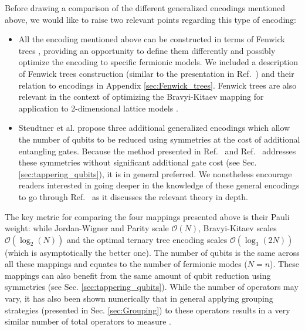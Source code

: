 Before drawing a comparison of the different generalized encodings mentioned above, we would like to raise two relevant points regarding this type of encoding: 
\begin{itemize}
    \item All the encoding mentioned above can be constructed in terms of Fenwick trees \cite{Havlek2017}, providing an opportunity to define them differently and possibly optimize the encoding to specific fermionic models. We included a description of Fenwick trees construction (similar to the presentation in Ref.~\cite{Havlek2017}) and their relation to encodings in Appendix \ref{sec:Fenwick_trees}. Fenwick trees are also relevant in the context of optimizing the Bravyi-Kitaev mapping for application to 2-dimensional lattice models \cite{Havlek2017}. 
    \item Steudtner et al. \cite{Steudtner2018} propose three additional generalized encodings which allow the number of qubits to be reduced using symmetries at the cost of additional entangling gates. Because the method presented in Ref.~\cite{bravyi_tapering_2017} and Ref.~\cite{Setia2020} addresses these symmetries without significant additional gate cost (see Sec. \ref{sec:tappering_qubits}), it is in general preferred. We nonetheless encourage readers interested in going deeper in the knowledge of these general encodings to go through Ref.~\cite{Steudtner2018} as it discusses the relevant theory in depth. 
\end{itemize}

The key metric for comparing the four mappings presented above is their Pauli weight: while Jordan-Wigner and Parity scale $\mathcal{O}(N)$, Bravyi-Kitaev scales $\mathcal{O}(\log_2(N))$ and the optimal ternary tree encoding scales $\mathcal{O}(\log_3(2N))$ (which is asymptotically the better one). The number of qubits is the same across all these mappings and equates to the number of fermionic modes ($N=n$). These mappings can also benefit from the same amount of qubit reduction using symmetries (see Sec. \ref{sec:tappering_qubits}). While the number of operators may vary, it has also been shown numerically that in general applying grouping strategies (presented in Sec. \ref{sec:Grouping}) to these operators results in a very similar number of total operators to measure \cite{Hamamura2020}. 

